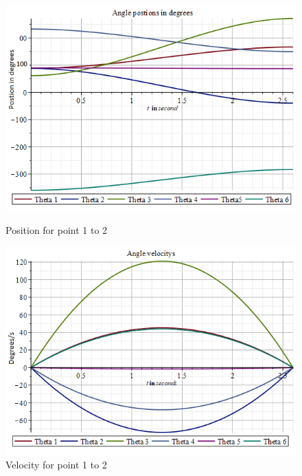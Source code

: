 \begin{figure}[H]
  \centering
  \begin{minipage}[b]{0.45\textwidth}
    \includegraphics[width=\textwidth]{Design/poscb.png}
    \caption{Position for point 1 to 2}
    \label{fig:position2}
  \end{minipage}
  \hfill
  \begin{minipage}[b]{0.45\textwidth}
    \includegraphics[width=\textwidth]{Design/velcb.png}
    \caption{Velocity for point 1 to 2}
    \label{fig:velocity2}
  \end{minipage}
\end{figure}
